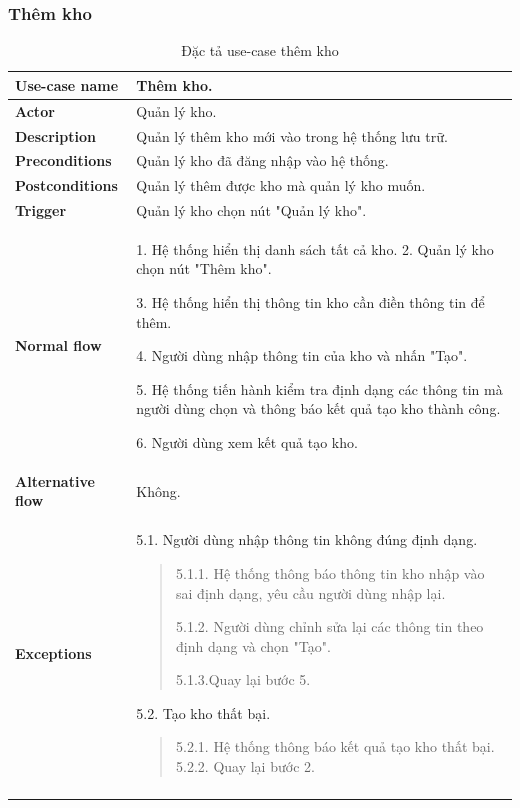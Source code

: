 \subsubsection{Thêm kho}
{
    \setlength\extrarowheight{6pt}
    \begin{longtable}{| p{} | p{} |}
        \hline
        \textbf{Use-case name}
         &
        Thêm kho.
        \\
        \hline
        \textbf{Actor}
         &
        Quản lý kho.
        \\
        \hline
        \textbf{Description}
         &
        Quản lý thêm kho mới vào trong hệ thống lưu trữ.
        \\
        \hline
        \textbf{Preconditions}
         &
        Quản lý kho đã đăng nhập vào hệ thống.
        \\
        \hline
        \textbf{Postconditions}
         &
        Quản lý thêm được kho mà quản lý kho muốn.
        \\
        \hline
        \textbf{Trigger}
         &
        Quản lý kho chọn nút "Quản lý kho".
        \\
        \hline
        \begin{flushleft}
            \textbf{Normal flow}
        \end{flushleft}
         &
        1. Hệ thống hiển thị danh sách tất cả kho.
        2. Quản lý kho chọn nút "Thêm kho".

        3. Hệ thống hiển thị thông tin kho cần điền thông tin để thêm.

        4. Người dùng nhập thông tin của kho và nhấn "Tạo".

        5. Hệ thống tiến hành kiểm tra định dạng các thông tin mà người dùng chọn và thông báo kết quả tạo kho thành công.

        6. Người dùng xem kết quả tạo kho.
        \\
        \hline
        \textbf{Alternative flow}
         &
        Không.
        \\
        \hline
        \textbf{Exceptions}
         &
        5.1. Người dùng nhập thông tin không đúng định dạng.
        \begin{quote}
            5.1.1. Hệ thống thông báo thông tin kho nhập vào sai định dạng, yêu cầu người dùng nhập lại.

            5.1.2. Người dùng chỉnh sửa lại các thông tin theo định dạng và chọn "Tạo".

            5.1.3.Quay lại bước 5.
        \end{quote}
        5.2. Tạo kho thất bại.
        \begin{quote}
            5.2.1. Hệ thống thông báo kết quả tạo kho thất bại.
            5.2.2. Quay lại bước 2.
        \end{quote}
        \\
        \hline
        \caption{Đặc tả use-case thêm kho}
    \end{longtable}
}

